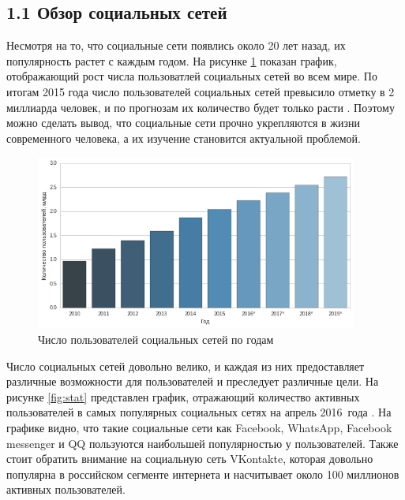 \documentclass[a4paper]{report}
\begin{document}
	\subsection{1.1 Обзор социальных сетей}
	
	
	
	Несмотря на то, что социальные сети появлись около 20 лет назад, их популярность растет с каждым годом. На рисунке \ref{fig:popularity}  показан график, отображающий рост числа пользоватлей социальных сетей во всем мире. По итогам 2015 года число пользователей социальных сетей превысило отметку в 2 миллиарда человек, и по прогнозам их количество будет только расти \cite{bib:Popularity}. Поэтому можно сделать вывод, что социальные сети прочно укрепляются в жизни современного человека, а их изучение становится актуальной проблемой.
	\newline
	\begin{figure}[h]
		
		\centering
		\includegraphics[width=400px]
		{imgs/Popularity.png}
		\caption{Число пользователей социальных сетей по годам}
		\label{fig:popularity}
	\end{figure}
	\newline			
	
	Число социальных сетей довольно велико, и каждая из них предоставляет различные возможности для пользователей и преследует различные цели.  На рисунке \ref{fig:stat} представлен график, отражающий количество активных пользователей в самых популярных социальных сетях на апрель 2016~года  \cite{bib:PopularNetwork}. На графике видно, что такие социальные сети как Facebook, WhatsApp, Facebook messenger и QQ пользуются наибольшей популярностью у пользователей. 	
	Также стоит обратить внимание на социальную сеть VKontakte, которая довольно популярна в российском сегменте интернета и насчитывает около 100 миллионов активных пользователей.
	
\end{document}
